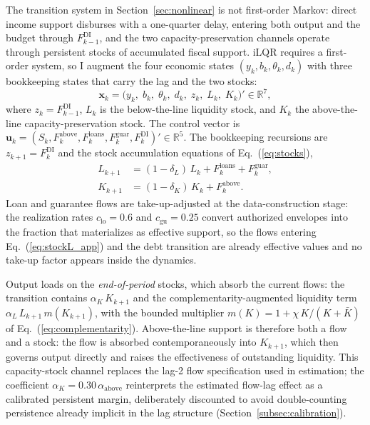 \documentclass[12pt, a4paper]{article}
\begin{document}
The transition system in Section~\ref{sec:nonlinear} is not first-order Markov:
direct income support disburses with a one-quarter delay, entering both output
and the budget through $F^{\text{DI}}_{k-1}$, and the two capacity-preservation
channels operate through persistent stocks of accumulated fiscal support. iLQR
requires a first-order system, so I augment the four economic states
$(y_k, b_k, \theta_k, d_k)$ with three bookkeeping states that carry the lag and
the two stocks:
%
\begin{equation}
    \bm{x}_k = \bigl(y_k,\; b_k,\; \theta_k,\; d_k,\;
    z_k,\; L_k,\; K_k\bigr)' \in \mathbb{R}^7,
    \label{eq:state7}
\end{equation}
%
where $z_k = F^{\text{DI}}_{k-1}$, $L_k$ is the below-the-line liquidity stock,
and $K_k$ the above-the-line capacity-preservation stock. The control vector is
$\bm{u}_k = (S_k, F^{\text{above}}_k, F^{\text{loans}}_k, F^{\text{guar}}_k,
F^{\text{DI}}_k)' \in \mathbb{R}^5$. The bookkeeping recursions are
$z_{k+1} = F^{\text{DI}}_k$ and the stock accumulation equations of
Eq.~(\ref{eq:stocks}),
%
\begin{align}
    L_{k+1} &= (1-\delta_L)\,L_k + F^{\text{loans}}_k + F^{\text{guar}}_k,
    \label{eq:stockL_app}\\
    K_{k+1} &= (1-\delta_K)\,K_k + F^{\text{above}}_k.
    \label{eq:stockK_app}
\end{align}
%
Loan and guarantee flows are take-up-adjusted at the data-construction stage:
the realization rates $c_{\text{lo}} = 0.6$ and $c_{\text{gu}} = 0.25$ convert
authorized envelopes into the fraction that materializes as effective support,
so the flows entering Eq.~(\ref{eq:stockL_app}) and the debt transition are
already effective values and no take-up factor appears inside the dynamics.

Output loads on the \emph{end-of-period} stocks, which absorb the current flows:
the transition contains $\alpha_K\, K_{k+1}$ and the complementarity-augmented
liquidity term $\alpha_L\, L_{k+1}\, m(K_{k+1})$, with the bounded multiplier
$m(K) = 1 + \chi\, K/(K + \bar K)$ of Eq.~(\ref{eq:complementarity}). Above-the-line
support is therefore both a flow and a stock: the flow is absorbed
contemporaneously into $K_{k+1}$, which then governs output directly and raises
the effectiveness of outstanding liquidity. This capacity-stock channel replaces
the lag-2 flow specification used in estimation; the coefficient
$\alpha_K = 0.30\,\alpha_{\text{above}}$ reinterprets the estimated flow-lag
effect as a calibrated persistent margin, deliberately discounted to avoid
double-counting persistence already implicit in the lag structure
(Section~\ref{subsec:calibration}).
\end{document}
